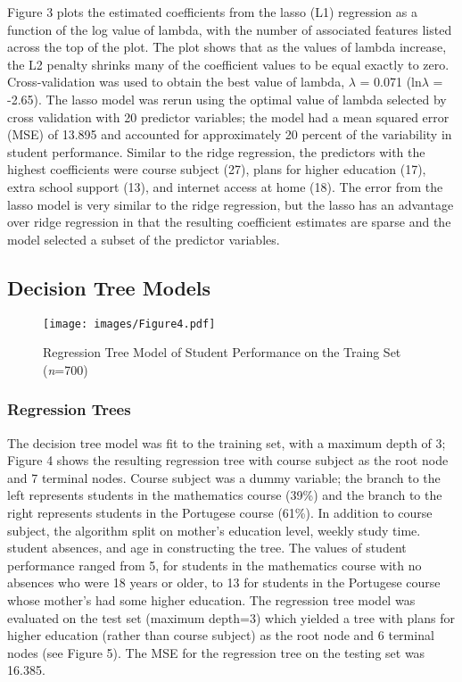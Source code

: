 \documentclass[sigconf]{acmart}
\begin{document}
Figure 3 plots the estimated coefficients from the lasso (L1) regression as 
a function of the log value of lambda, with the number of associated features 
listed across the top of the plot. The plot shows that as the values of lambda 
increase, the L2 penalty shrinks many of the coefficient values to be equal 
exactly to zero. Cross-validation was used to obtain the best value of lambda, 
$\lambda$ = 0.071 (ln$\lambda$ = -2.65). The lasso model was rerun using the 
optimal value of lambda selected by cross validation with 20 predictor 
variables; the model had a mean squared error (MSE) of 13.895 and accounted 
for approximately 20 percent of the variability in student performance. 
Similar to the ridge regression, the predictors with the highest coefficients 
were course subject (27), plans for higher education (17), extra school support 
(13), and internet access at home (18). The error from the lasso model is very 
similar to the ridge regression, but the lasso has an advantage over ridge 
regression in that the resulting coefficient estimates are sparse and the 
model selected a subset of the predictor variables. 


\subsection{Decision Tree Models}

\begin{figure}[!ht]
  \centering\texttt{[image: images/Figure4.pdf]}
  \caption{Regression Tree Model of Student Performance on the 
  Traing Set (\textit{n}=700)}
  \label{f:Figure4}
\end{figure}


\subsubsection{Regression Trees}

The decision tree model was fit to the training set, with a maximum depth of 3;
Figure 4 shows the resulting regression tree with course subject as the root 
node and 7 terminal nodes. Course subject was a dummy variable; the branch to 
the left represents students in the mathematics course (39\%) and the branch to 
the right represents students in the Portugese course (61\%). In addition to 
course subject, the algorithm split on mother's education level, weekly study 
time. student absences, and age in constructing the tree. The values of student 
performance ranged from 5, for students in the mathematics course with no 
absences who were 18 years or older, to 13 for students in the Portugese course 
whose mother's had some higher education. The regression tree model was evaluated 
on the test set (maximum depth=3) which yielded a tree with plans for higher 
education (rather than course subject) as the root node and 6 terminal nodes 
(see Figure 5). The MSE for the regression tree on the testing set was 16.385.
\end{document}
